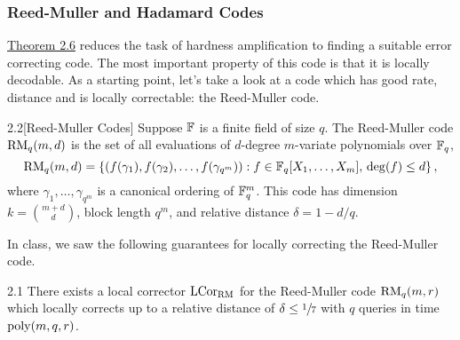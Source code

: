 \documentclass[11pt]{article}
\begin{document}
\subsubsection{Reed-Muller and Hadamard Codes}

\hyperref[t-2-6]{Theorem 2.6} reduces the task of hardness amplification to finding a suitable error correcting code. The most important property of this code is that it is locally decodable. As a starting point, let's take a look at a code which has good rate, distance and is locally correctable: the Reed-Muller code.

\begin{definition}{2.2}[Reed-Muller Codes]
    Suppose $\mathbb{F}$ is a finite field of size $q$. The Reed-Muller code $\mathrm{RM}_q(m, d)$ is the set of all evaluations of $d$-degree $m$-variate polynomials over $\mathbb{F}_q$,
    \begin{equation*}
        \mathrm{RM}_q(m ,d) = \left\{(f(\gamma_1), f(\gamma_2), \ldots, f(\gamma_{q^m})) : f \in \mathbb{F}_q[X_1, \ldots, X_m], \, \deg (f) \leq d\right\},
    \end{equation*}
    where $\gamma_1, \ldots, \gamma_{q^m}$ is a canonical ordering of $\mathbb{F}_q^m$. This code has dimension $k = \binom{m + d}{d}$, block length $q^m$, and relative distance $\delta = 1 - d/ q$.
\end{definition}

In class, we saw the following guarantees for locally correcting the Reed-Muller code.

\begin{claim}{2.1}
    There exists a local corrector ${\textup{LCor}}_{\mathrm{RM}}$ for the Reed-Muller code $\mathrm{RM}_q(m, r)$ which locally corrects up to a relative distance of $\delta \leq \sfrac{1}{7}$ with $q$ queries in time $\mathrm{poly}(m, q, r)$.
\end{claim}
\end{document}
